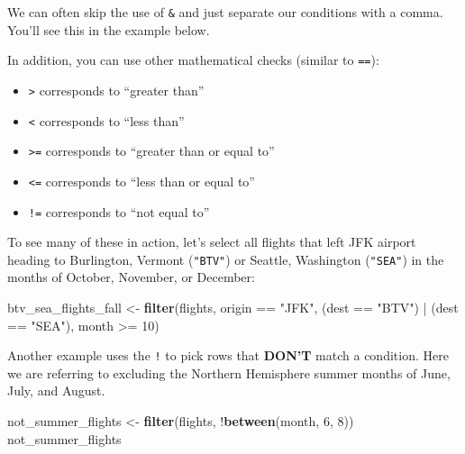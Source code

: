 \documentclass[]{tufte-book}
\newenvironment{Shaded}{\begin{snugshade}}{\end{snugshade}}
\newcommand{\KeywordTok}[1]{\textcolor[rgb]{0.13,0.29,0.53}{\textbf{{#1}}}}
\newcommand{\DecValTok}[1]{\textcolor[rgb]{0.00,0.00,0.81}{{#1}}}
\newcommand{\StringTok}[1]{\textcolor[rgb]{0.31,0.60,0.02}{{#1}}}
\newcommand{\NormalTok}[1]{{#1}}
\providecommand{\tightlist}{%
  \setlength{\itemsep}{0pt}\setlength{\parskip}{0pt}}
\begin{document}
We can often skip the use of \texttt{\&} and just separate our
conditions with a comma. You'll see this in the example below.

In addition, you can use other mathematical checks (similar to
\texttt{==}):

\begin{itemize}
\tightlist
\item
  \texttt{\textgreater{}} corresponds to ``greater than''
\item
  \texttt{\textless{}} corresponds to ``less than''
\item
  \texttt{\textgreater{}=} corresponds to ``greater than or equal to''
\item
  \texttt{\textless{}=} corresponds to ``less than or equal to''
\item
  \texttt{!=} corresponds to ``not equal to''
\end{itemize}

To see many of these in action, let's select all flights that left JFK
airport heading to Burlington, Vermont (\texttt{"BTV"}) or Seattle,
Washington (\texttt{"SEA"}) in the months of October, November, or
December:

\begin{Shaded}
\begin{Highlighting}[]
\NormalTok{btv_sea_flights_fall <-}\StringTok{ }\KeywordTok{filter}\NormalTok{(flights,}
                               \NormalTok{origin ==}\StringTok{ "JFK"}\NormalTok{, }
                               \NormalTok{(dest ==}\StringTok{ "BTV"}\NormalTok{) |}\StringTok{ }\NormalTok{(dest ==}\StringTok{ "SEA"}\NormalTok{),}
                               \NormalTok{month >=}\StringTok{ }\DecValTok{10}\NormalTok{)}
\end{Highlighting}
\end{Shaded}

Another example uses the \texttt{!} to pick rows that \textbf{DON'T}
match a condition. Here we are referring to excluding the Northern
Hemisphere summer months of June, July, and August.

\begin{Shaded}
\begin{Highlighting}[]
\NormalTok{not_summer_flights <-}\StringTok{ }\KeywordTok{filter}\NormalTok{(flights,}
                             \NormalTok{!}\KeywordTok{between}\NormalTok{(month, }\DecValTok{6}\NormalTok{, }\DecValTok{8}\NormalTok{))}
\NormalTok{not_summer_flights}
\end{Highlighting}
\end{Shaded}
\end{document}
